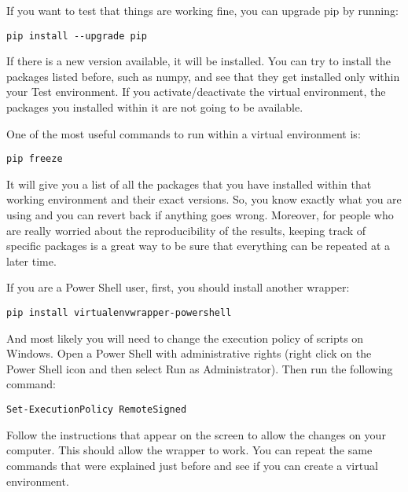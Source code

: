 If you want to test that things are working fine, you can upgrade pip by running:

\begin{verbatim}
pip install --upgrade pip
\end{verbatim}

If there is a new version available, it will be installed. You can try to install the packages listed before, such as numpy, and see that they get installed only within your Test environment. If you activate/deactivate the virtual environment, the packages you installed within it are not going to be available.

One of the most useful commands to run within a virtual environment is:

\begin{verbatim}
pip freeze
\end{verbatim}

It will give you a list of all the packages that you have installed within that working environment and their exact versions. So, you know exactly what you are using and you can revert back if anything goes wrong. Moreover, for people who are really worried about the reproducibility of the results, keeping track of specific packages is a great way to be sure that everything can be repeated at a later time.


If you are a Power Shell user, first, you should install another wrapper:

\begin{verbatim}
pip install virtualenvwrapper-powershell
\end{verbatim}

And most likely you will need to change the execution policy of scripts on Windows. Open a Power Shell with administrative rights (right click on the Power Shell icon and then select Run as Administrator). Then run the following command:

\begin{verbatim}
Set-ExecutionPolicy RemoteSigned
\end{verbatim}

Follow the instructions that appear on the screen to allow the changes on your computer. This should allow the wrapper to work. You can repeat the same commands that were explained just before and see if you can create a virtual environment.

